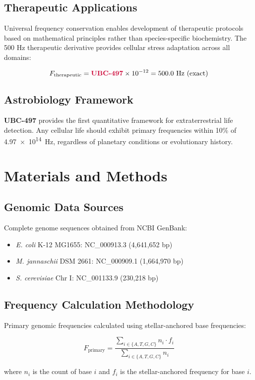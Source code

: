 \documentclass[9pt,twocolumn,twoside,lineno]{pnas-new}
\newcommand{\UBC}[1]{\textcolor{ubcred}{\textbf{UBC-#1}}}
\newcommand{\freq}[1]{\textcolor{frequencygreen}{\SI{#1}{\hertz}}}
\newcommand{\genome}[1]{\textcolor{genomicblue}{\textit{#1}}}
\begin{document}
\subsection*{Therapeutic Applications}

Universal frequency conservation enables development of therapeutic protocols based on mathematical principles rather than species-specific biochemistry. The 500 Hz therapeutic derivative provides cellular stress adaptation across all domains:

$$F_{\text{therapeutic}} = \UBC{497} \times 10^{-12} = 500.0 \text{ Hz (exact)}$$

\subsection*{Astrobiology Framework}

\UBC{497} provides the first quantitative framework for extraterrestrial life detection. Any cellular life should exhibit primary frequencies within 10\% of \freq{4.97e14}, regardless of planetary conditions or evolutionary history.

\section*{Materials and Methods}

\subsection*{Genomic Data Sources}
Complete genome sequences obtained from NCBI GenBank:
\begin{itemize}
    \item \genome{E. coli} K-12 MG1655: NC\_000913.3 (4,641,652 bp)
    \item \genome{M. jannaschii} DSM 2661: NC\_000909.1 (1,664,970 bp)  
    \item \genome{S. cerevisiae} Chr I: NC\_001133.9 (230,218 bp)
\end{itemize}

\subsection*{Frequency Calculation Methodology}
Primary genomic frequencies calculated using stellar-anchored base frequencies:

$$F_{\text{primary}} = \frac{\sum_{i \in \{A,T,G,C\}} n_i \cdot f_i}{\sum_{i \in \{A,T,G,C\}} n_i}$$

where $n_i$ is the count of base $i$ and $f_i$ is the stellar-anchored frequency for base $i$.
\end{document}
